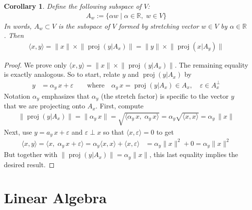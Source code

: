 \documentclass[12pt]{article}
\numberwithin{equation}{section} %
\theoremstyle{plain}
\newtheorem{cor}[thm]{Corollary}
\theoremstyle{definition}
\theoremstyle{remark}
\newcommand{\proj}{\operatorname{proj}}
\newcommand{\R}{\mathbb{R}}
\begin{document}
\begin{cor}
Define the following subspace of $V$:
\begin{align*}
  A_w:=\{\alpha w\;|\; \alpha\in \R, \; w\in V\}
\end{align*}
In words, $A_w\subset V$ is the subspace of $V$ formed by stretching
vector $w\in V$ by $\alpha\in\R$.
Then
\begin{align*}
  \langle x, y \rangle
  = \lVert x\rVert \times \lVert \proj(y|A_x)\rVert
  = \lVert y\rVert \times \lVert \proj(x|A_y)\rVert
\end{align*}
\end{cor}
\begin{proof}
We prove only
$\langle x, y \rangle
= \lVert x\rVert \times \lVert \proj(y|A_x)\rVert$.
The remaining equality is exactly analogous.
So to start, relate $y$ and $\proj(y|A_x)$ by
\begin{align*}
  y &= \alpha_y \, x + \varepsilon
  \qquad
  \text{where}\quad
  \alpha_y\, x= \proj(y|A_x)\in A_x,
  \quad \varepsilon\in A_x^\perp
\end{align*}
Notation $\alpha_y$ emphasizes that $\alpha_y$ (the stretch factor) is
specific to the vector $y$ that we are projecting onto $A_x$.
First, compute
\begin{align*}
  \lVert \proj(y|A_x)\rVert
  = \lVert \alpha_y \, x\rVert
  = \sqrt{\langle
    \alpha_y \, x,
    \;\alpha_y \, x\rangle}
  = \alpha_y \sqrt{\langle x, x\rangle}
  = \alpha_y \,\lVert x\rVert
\end{align*}
Next, use $y=a_y\,x + \varepsilon$ and $\varepsilon\perp x$ so that
$\langle x,\varepsilon\rangle=0$ to get
\begin{align*}
  \langle x, y \rangle
  =
  \langle x, \; \alpha_y \, x + \varepsilon \rangle
  =
  \alpha_y \langle x, x \rangle
  + \langle x, \varepsilon \rangle
  &=
  \alpha_y \lVert x\rVert^2
  + 0
  = \alpha_y \lVert x\rVert^2
\end{align*}
But together with
$\lVert \proj(y|A_x)\rVert = \alpha_y\lVert x\rVert$, this last equality
implies the desired result.
\end{proof}





\clearpage
\section{Linear Algebra}
\end{document}
